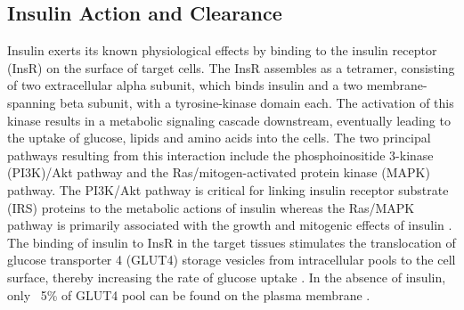 \subsection{Insulin Action and Clearance} %
\label{sec:insact}
Insulin exerts its known physiological effects by binding to the insulin receptor (InsR) on the surface of target cells. The InsR assembles as a tetramer, consisting of two extracellular alpha subunit, which binds insulin and a two membrane-spanning beta subunit, with a tyrosine-kinase domain each. The activation of this kinase results in a metabolic signaling cascade downstream, eventually leading to the uptake of glucose, lipids and amino acids into the cells. The two principal pathways resulting from this interaction include the phosphoinositide 3-kinase (PI3K)/Akt pathway and the Ras/mitogen-activated protein kinase (MAPK) pathway. The PI3K/Akt pathway is critical for linking insulin receptor substrate (IRS) proteins to the metabolic actions of insulin whereas the Ras/MAPK pathway is primarily associated with the growth and mitogenic effects of insulin \textbf{\cite{de_meyts_insulin_2000}}. The binding of insulin to InsR in the target tissues stimulates the translocation of glucose transporter 4 (GLUT4) storage vesicles from intracellular pools to the cell surface, thereby increasing the rate of glucose uptake \textbf{\cite{shepherd_glucose_1999,saltiel_insulin_2001,leto_regulation_2012}}. In the absence of insulin, only ~5\% of GLUT4 pool can be found on the plasma membrane \textbf{\cite{leto_regulation_2012}}.
\\\\










